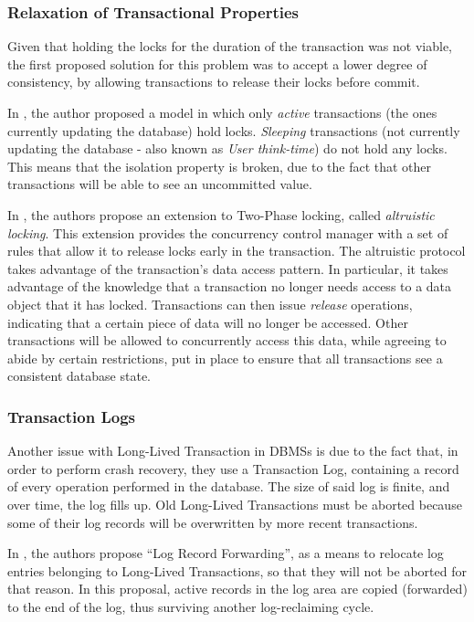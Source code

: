 \documentclass{llncs}
\begin{document}
\subsubsection{Relaxation of Transactional Properties}

Given that holding the locks for the duration of the transaction was
not viable, the first proposed solution for this problem was to accept
a lower degree of consistency, by allowing transactions to release
their locks before commit.

In \cite{gray1981transaction}, the author proposed a model in which
only {\it active} transactions (the ones currently updating the
database) hold locks. {\it Sleeping} transactions (not currently
updating the database - also known as {\it User think-time}) do not
hold any locks. This means that the isolation property is broken, due
to the fact that other transactions will be able to see an uncommitted
value.

In \cite{salem1989altruistic}, the authors propose an extension to
Two-Phase locking, called {\it altruistic locking}. This extension
provides the concurrency control manager with a set of rules that
allow it to release locks early in the transaction. The altruistic
protocol takes advantage of the transaction's data access pattern. In
particular, it takes advantage of the knowledge that a transaction no
longer needs access to a data object that it has locked. Transactions
can then issue {\it release} operations, indicating that a certain
piece of data will no longer be accessed. Other transactions will be
allowed to concurrently access this data, while agreeing to abide by
certain restrictions, put in place to ensure that all transactions see
a consistent database state.

\subsubsection{Transaction Logs}

Another issue with Long-Lived Transaction in DBMSs is due to the fact
that, in order to perform crash recovery, they use a Transaction Log,
containing a record of every operation performed in the database. The
size of said log is finite, and over time, the log fills up. Old
Long-Lived Transactions must be aborted because some of their log
records will be overwritten by more recent transactions.

In \cite{hagmann1991implementing}, the authors propose ``Log Record
Forwarding'', as a means to relocate log entries belonging to
Long-Lived Transactions, so that they will not be aborted for that
reason. In this proposal, active records in the log area are copied
(forwarded) to the end of the log, thus surviving another
log-reclaiming cycle.
\end{document}
